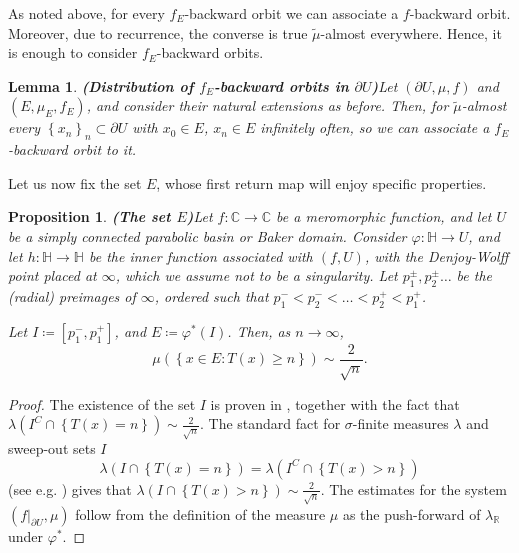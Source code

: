 \documentclass[11pt]{article}
\newtheorem{prop}[thm]{Proposition}
\newtheorem{lemma}[thm]{Lemma}
\theoremstyle{definition}
\theoremstyle{remark}
\newcounter{main}
\theoremstyle{plain}
\begin{document}
As noted above, for every $ f_{E} $-backward orbit we can associate a $ f $-backward orbit. Moreover, due to recurrence, the converse is true $ \widetilde{ \mu} $-almost everywhere. Hence, it is enough to consider $ f_{E} $-backward orbits.

\begin{lemma}{\bf (Distribution of $ f_{E} $-backward orbits in $ \partial U $)}\label{lemma-FRM}
	Let  $ (\partial U, \mu, f) $ and  $ (E, \mu_E, f_{E}) $, and consider their natural extensions as before. Then, for $ \widetilde{\mu} $-almost every $ \left\lbrace x_n\right\rbrace _n\subset \partial U $ with $ x_0\in E $,  $ x_n\in E $ infinitely often, so we can associate a  $ f_{E} $-backward orbit to it.
\end{lemma}

Let us now fix the set $ E $, whose first return map will enjoy specific properties. 

\begin{prop}{\bf (The set $ E $)}\label{lemmaE}
		Let $ f\colon\mathbb{C}\to\mathbb{C}$ be a meromorphic function, and let $U$ be a simply connected parabolic basin or   Baker domain. Consider $ \varphi\colon \mathbb{H} \to U$, and let $ h\colon\mathbb{H}\to\mathbb{H} $ be the inner function associated with $ (f, U) $, with the Denjoy-Wolff point placed at $ \infty $, which we assume not to be a singularity. Let $ p^\pm_1 , p^\pm_2\dots$ be the (radial) preimages of $ \infty $, ordered such that $ p^-_1<p^-_2<\dots<p^+_2<p^+_1 $.
		
		
		Let $I\coloneqq \left[ p^-_1, p^+_1\right] $, and  $E\coloneqq \varphi^*(I) $. Then, as $ n\to\infty $,
		\[\mu(\left\lbrace x\in E\colon T(x)\geq n\right\rbrace )\sim \frac2{\sqrt n}.\]
\end{prop}
\begin{proof}
	The existence of the set $ I $ 
	is proven in
	\cite[Sect. 9.2]{ivrii2023inner}, together with the fact that $ \lambda(I^C\cap \left\lbrace T(x)=n\right\rbrace )\sim \frac2{\sqrt n} $. The standard fact for $ \sigma $-finite measures $ \lambda $ and sweep-out sets $ I $
	\[\lambda(I\cap \left\lbrace T(x)=n\right\rbrace )=\lambda(I^C\cap \left\lbrace T(x)>n\right\rbrace )\] (see e.g. \cite[p.19, Corol. 1]{notesInfErgodicTheory}) gives that $ \lambda(I\cap \left\lbrace T(x)>n\right\rbrace )\sim \frac2{\sqrt n} $.
	The estimates for the system $ (f|_{\partial U}, \mu) $ follow from the definition of the measure $ \mu $ as the push-forward of $ \lambda_\mathbb{R} $ under $ \varphi^* $.
\end{proof}
\end{document}
